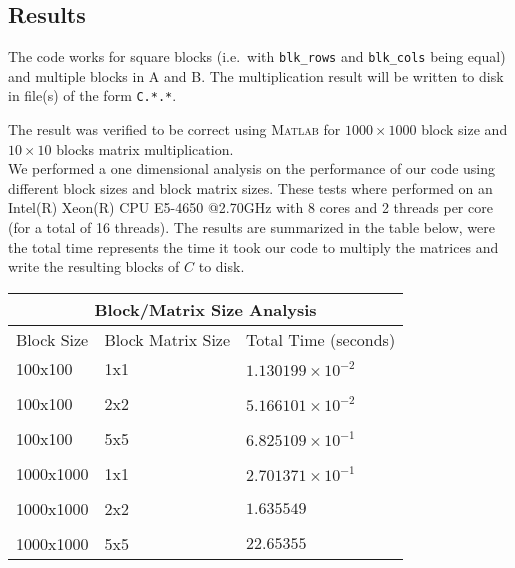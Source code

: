 \documentclass[12pt]{article}
\newcommand{\0}{\mathbf{0}}
\begin{document}
\subsection{Results}

The code works for square blocks (i.e.~with \texttt{blk\_rows} and \texttt{blk\_cols} being equal) and multiple blocks in A and B.
The multiplication result will be written to disk in file(s) of the form \texttt{C.*.*}.

The result was verified to be correct using \textsc{Matlab} for $1000\times1000$ block size and $10\times10$ blocks matrix multiplication. \\

We performed a one dimensional analysis on the performance of our code using different block sizes and block matrix sizes. These tests where performed on an Intel(R) Xeon(R) CPU E5-4650 @2.70GHz with 8 cores and 2 threads per core (for a total of 16 threads). The results are summarized in the table below, were the total time represents the time it took our code to multiply the matrices and write the resulting blocks of $C$ to disk.

\begin{center}

    \begin{tabular}{|p{2cm}| |p{2cm}||p{3cm}|}
	\hline
	\multicolumn{3}{|c|}{Block/Matrix Size Analysis} \\
	\hline
	Block Size& Block Matrix Size &Total Time (seconds)  \\
	\hline
	100x100 & 1x1 &  $1.130199\times10^{-2}$   \\
	&  &    \\

	100x100& 2x2& $5.166101\times10^{-2}$   \\ 

	& &   \\

	100x100 & 5x5 & $6.825109\times10^{-1}$  \\

	& &   \\

	1000x1000 & 1x1 & $2.701371\times10^{-1}$    \\

	& &  \\

	1000x1000& 2x2 & $1.635549$   \\

	& &  \\

	1000x1000& 5x5 & $22.65355$   \\

	\hline
    \end{tabular}

\end{center}
\end{document}
